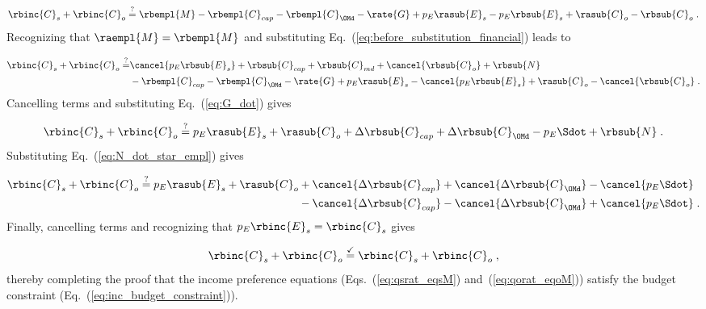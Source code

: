 \begin{equation}
  \rbinc{C}_s + \rbinc{C}_o \stackrel{?}{=} \rbempl{M} - \rbempl{C}_{cap} - \rbempl{C}_{\OMd} - \rate{G} 
            + p_E \rasub{E}_s - p_E \rbsub{E}_s + \rasub{C}_o - \rbsub{C}_o \; .
\end{equation}
%
Recognizing that $\raempl{M} = \rbempl{M}$ and substituting Eq.~(\ref{eq:before_substitution_financial})
leads to 

\begin{align}
  \rbinc{C}_s + \rbinc{C}_o \stackrel{?}{=} & \cancel{p_E \rbsub{E}_s} + \rbsub{C}_{cap} + \rbsub{C}_{md}
                                              + \cancel{\rbsub{C}_o} + \rbsub{N} \nonumber \\
                                            & - \rbempl{C}_{cap} - \rbempl{C}_{\OMd} - \rate{G}
                                              + p_E \rasub{E}_s - \cancel{p_E \rbsub{E}_s}
                                              + \rasub{C}_o - \cancel{\rbsub{C}_o} \; .
\end{align}
%
Cancelling terms and substituting Eq.~(\ref{eq:G_dot}) gives

\begin{equation}
  \rbinc{C}_s + \rbinc{C}_o \stackrel{?}{=} p_E \rasub{E}_s + \rasub{C}_o
                                            + \Delta \rbsub{C}_{cap} + \Delta \rbsub{C}_{\OMd}
                                            - p_E \Sdot + \rbsub{N} \; .
\end{equation}
%
Substituting Eq.~(\ref{eq:N_dot_star_empl}) gives 

\begin{align}
  \rbinc{C}_s + \rbinc{C}_o \stackrel{?}{=} p_E \rasub{E}_s + \rasub{C}_o
        & + \cancel{\Delta \rbsub{C}_{cap}} + \cancel{\Delta \rbsub{C}_{\OMd}} - \cancel{p_E \Sdot} \nonumber \\
        & - \cancel{\Delta \rbsub{C}_{cap}} - \cancel{\Delta \rbsub{C}_{\OMd}} + \cancel{p_E \Sdot} \; .
\end{align}
%
Finally, cancelling terms and recognizing that $p_E \rbinc{E}_s = \rbinc{C}_s$ gives

\begin{equation}
  \rbinc{C}_s + \rbinc{C}_o \stackrel{\checkmark}{=} \rbinc{C}_s + \rbinc{C}_o \; ,
\end{equation}
%
thereby completing the proof that the income preference equations
(Eqs.~(\ref{eq:qsrat_eqsM}) and~(\ref{eq:qorat_eqoM}))
satisfy the budget constraint
(Eq.~(\ref{eq:inc_budget_constraint})).